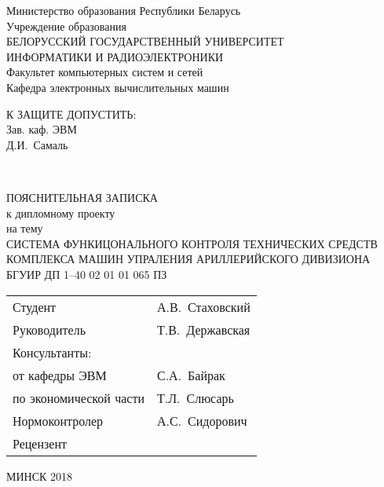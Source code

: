 \begin{titlepage}
  \begin{center}
    Министерство образования Республики Беларусь \\[1em]
    Учреждение образования \\
    БЕЛОРУССКИЙ ГОСУДАРСТВЕННЫЙ УНИВЕРСИТЕТ \\
    ИНФОРМАТИКИ И РАДИОЭЛЕКТРОНИКИ \\[1em]

    Факультет компьютерных систем и сетей \\ [1em]
    Кафедра электронных вычислительных машин \\[2em]

    \begin{flushright}
      \begin{minipage}{0.4\textwidth}
        К ЗАЩИТЕ ДОПУСТИТЬ: \\
        Зав. каф. ЭВМ \\
        \underline{\hspace*{2.8cm}} Д.И.~Самаль
      \end{minipage}\\[2.2em]
    \end{flushright}

    {ПОЯСНИТЕЛЬНАЯ ЗАПИСКА}\\
    {к дипломному проекту}\\
    {на тему}\\
    {СИСТЕМА ФУНКИЦОНАЛЬНОГО КОНТРОЛЯ ТЕХНИЧЕСКИХ СРЕДСТВ КОМПЛЕКСА МАШИН УПРАЛЕНИЯ АРИЛЛЕРИЙСКОГО ДИВИЗИОНА}\\[2em]


    {БГУИР ДП 1--40 02 01 01 065 ПЗ}\\[2em]

    \begin{tabular}{ p{}p{} }
      Студент & А.В.~Стаховский\\[1em]
      Руководитель & Т.В.~Державская \\[1em]
      Консультанты: &\\[1em]
      \hspace*{3ex}от кафедры ЭВМ & С.А.~Байрак \\[1em]
      \hspace*{3ex}по экономической части & Т.Л.~Слюсарь \\[1em]
      Нормоконтролер & А.С.~Сидорович\\[1em]
      Рецензент &
    \end{tabular}

    \vfill
    {\normalsize МИНСК 2018}
  \end{center}
\end{titlepage}
